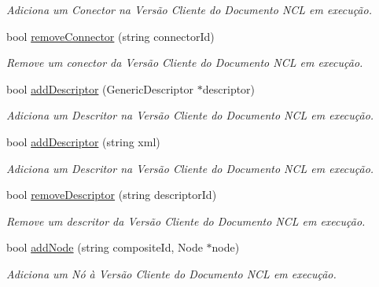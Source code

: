 \begin{DoxyCompactItemize}
\begin{DoxyCompactList}\small\item\em Adiciona um Conector na Versão Cliente do Documento NCL em execução. \item\end{DoxyCompactList}\item 
bool \hyperlink{classbr_1_1ufscar_1_1lince_1_1ginga_1_1wac_1_1editing_1_1ClientEditingManager_a5b6ddc8a6259b07eae8f2c2f03dcdfaa}{removeConnector} (string connectorId)
\begin{DoxyCompactList}\small\item\em Remove um conector da Versão Cliente do Documento NCL em execução. \item\end{DoxyCompactList}\item 
bool \hyperlink{classbr_1_1ufscar_1_1lince_1_1ginga_1_1wac_1_1editing_1_1ClientEditingManager_ad43d65396682df3c57e131e5531e7e4d}{addDescriptor} (GenericDescriptor $\ast$descriptor)
\begin{DoxyCompactList}\small\item\em Adiciona um Descritor na Versão Cliente do Documento NCL em execução. \item\end{DoxyCompactList}\item 
bool \hyperlink{classbr_1_1ufscar_1_1lince_1_1ginga_1_1wac_1_1editing_1_1ClientEditingManager_ab6fd5b9535b8d6e377aab7b7af4c2902}{addDescriptor} (string xml)
\begin{DoxyCompactList}\small\item\em Adiciona um Descritor na Versão Cliente do Documento NCL em execução. \item\end{DoxyCompactList}\item 
bool \hyperlink{classbr_1_1ufscar_1_1lince_1_1ginga_1_1wac_1_1editing_1_1ClientEditingManager_a9b25cb3580c52ddb8147ede64ec53077}{removeDescriptor} (string descriptorId)
\begin{DoxyCompactList}\small\item\em Remove um descritor da Versão Cliente do Documento NCL em execução. \item\end{DoxyCompactList}\item 
bool \hyperlink{classbr_1_1ufscar_1_1lince_1_1ginga_1_1wac_1_1editing_1_1ClientEditingManager_a8e27f52402bb58a3e49d63b28652b2b9}{addNode} (string compositeId, Node $\ast$node)
\begin{DoxyCompactList}\small\item\em Adiciona um Nó à Versão Cliente do Documento NCL em execução. \item\end{DoxyCompactList}\item 

\end{DoxyCompactItemize}
